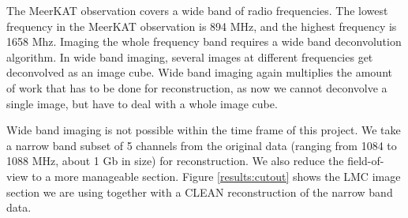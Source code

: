 The MeerKAT observation covers a wide band of radio frequencies. The lowest frequency in the MeerKAT observation is 894 MHz, and the highest frequency is 1658 Mhz.
Imaging the whole frequency band requires a wide band deconvolution algorithm. In wide band imaging, several images at different frequencies get deconvolved as an image cube. Wide band imaging again multiplies the amount of work that has to be done for reconstruction, as now we cannot deconvolve a single image, but have to deal with a whole image cube.

Wide band imaging is not possible within the time frame of this project. We take a narrow band subset of 5 channels from the original data (ranging from 1084 to 1088 MHz, about 1 Gb in size) for reconstruction. We also reduce the field-of-view to a more manageable section. Figure \ref{results:cutout} shows the LMC image section we are using together with a CLEAN reconstruction of the narrow band data.

